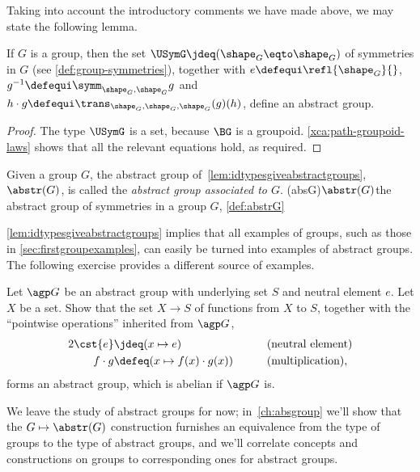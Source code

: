 Taking into account the introductory comments we have made above, we may state the following lemma.

\begin{lemma}\label{lem:idtypesgiveabstractgroups}
  If $G$ is a group, then the set $\USymG \jdeq (\sh_G\eqto\sh_G)$
  of symmetries in $G$ (see \cref{def:group-symmetries}),
  together with $e\defequi\refl{\shape_G}{}$,
  $g^{-1}\defequi\symm_{\shape_G,\shape_G}g$
  and $h \cdot g \defequi \trans_{\shape_G,\shape_G,\shape_G}(g)(h)$, define an abstract group.
\end{lemma}

\begin{proof}
  The type $\USymG$ is a set, because $\BG$ is a groupoid.
  \cref{xca:path-groupoid-laws} shows that all the relevant equations hold, as required.
\end{proof}

\begin{definition}\label{def:abstrG}
  Given a group $G$, the abstract group of~\cref{lem:idtypesgiveabstractgroups},
  $\abstr(G)$, is called the \emph{abstract group associated to $G$}.%
  \glossary(absG){$\protect\abstr(G)$}{the abstract group of symmetries in a group $G$,
  \cref{def:abstrG}}
\end{definition}

\cref{lem:idtypesgiveabstractgroups} implies that all examples of
groups, such as those in \cref{sec:firstgroupexamples}, can easily
be turned into examples of abstract groups. The following exercise
provides a different source of examples.

\begin{xca}\label{xca:abstract-group-of-maps}
  Let $\agp G$ be an abstract group with underlying set $S$
  and neutral element $e$.
  Let $X$ be a set. Show that the set $X\to S$ of functions
  from $X$ to $S$, together with the ``pointwise operations''
  inherited from $\agp G$,
  \begin{alignat*}2
    \cst{e} &\jdeq (x \mapsto e) &\qquad &\text{(neutral element)}\\
    f \cdot g &\defeq (x \mapsto f(x) \cdot g(x)) &\qquad &\text{(multiplication)},
  \end{alignat*}
  forms an abstract group, which is abelian if $\agp G$ is.
\end{xca}

We leave the study of abstract groups for now;
in~\cref{ch:absgroup} we'll
show that the $G \mapsto \abstr(G)$ construction
furnishes an equivalence from the type of groups to the type of abstract groups,
and we'll correlate concepts and constructions on groups
to corresponding ones for abstract groups.

